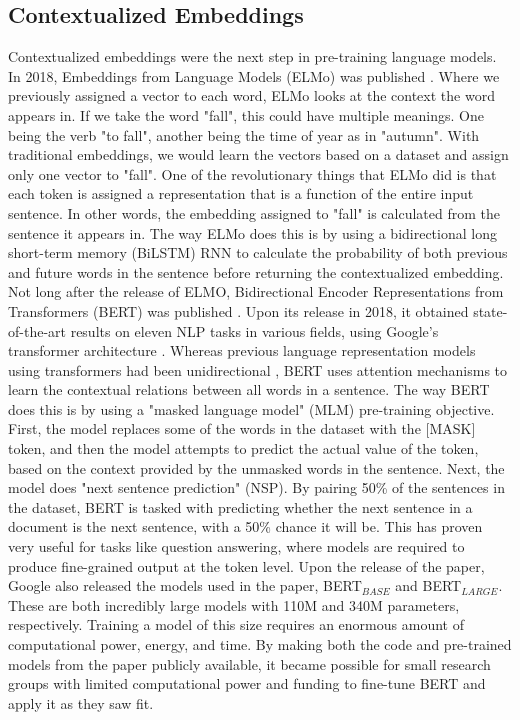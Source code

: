 \subsection{Contextualized Embeddings}
Contextualized embeddings were the next step in pre-training language models. In 2018, Embeddings from Language Models (ELMo) was published \cite{Peters:2018}. Where we previously assigned a vector to each word, ELMo looks at the context the word appears in. If we take the word "fall", this could have multiple meanings. One being the verb "to fall", another being the time of year as in "autumn". With traditional embeddings, we would learn the vectors based on a dataset and assign only one vector to "fall". One of the revolutionary things that ELMo did is that each token is assigned a representation that is a function of the entire input sentence. In other words, the embedding assigned to "fall" is calculated from the sentence it appears in. The way ELMo does this is by using a bidirectional long short-term memory (BiLSTM) RNN to calculate the probability of both previous and future words in the sentence before returning the contextualized embedding.\\
Not long after the release of ELMO, Bidirectional Encoder Representations from Transformers (BERT) was published \cite{devlin-etal-2019-bert}. Upon its release in 2018, it obtained state-of-the-art results on eleven NLP tasks in various fields, using Google's transformer architecture \cite{DBLP:journals/corr/VaswaniSPUJGKP17}. Whereas previous language representation models using transformers had been unidirectional \cite{radford2018improving}, BERT uses attention mechanisms to learn the contextual relations between all words in a sentence. The way BERT does this is by using a "masked language model" (MLM) pre-training objective. First, the model replaces some of the words in the dataset with the [MASK] token, and then the model attempts to predict the actual value of the token, based on the context provided by the unmasked words in the sentence. Next, the model does "next sentence prediction" (NSP). By pairing 50\% of the sentences in the dataset, BERT is tasked with predicting whether the next sentence in a document is the next sentence, with a 50\% chance it will be. This has proven very useful for tasks like question answering, where models are required to produce fine-grained output at the token level. Upon the release of the paper, Google also released the models used in the paper, BERT$_{BASE}$ and BERT$_{LARGE}$. These are both incredibly large models with 110M and 340M parameters, respectively. Training a model of this size requires an enormous amount of computational power, energy, and time. By making both the code and pre-trained models from the paper publicly available, it became possible for small research groups with limited computational power and funding to fine-tune BERT and apply it as they saw fit.
